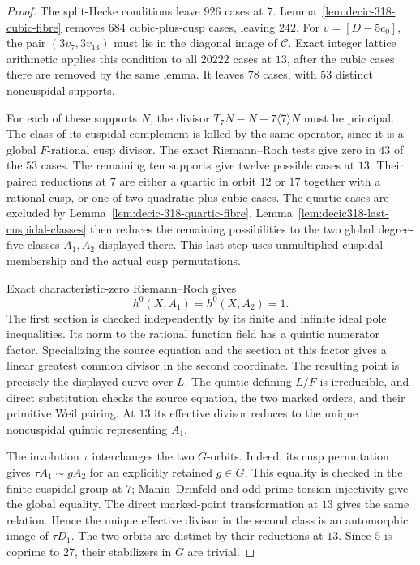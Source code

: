 \begin{proof}
The split-Hecke conditions leave $926$ cases at $7$.
Lemma~\ref{lem:decic-318-cubic-fibre} removes $684$ cubic-plus-cusp
cases, leaving $242$.
For $v=[D-5c_0]$, the pair
$(3\overline v_7,3\overline v_{13})$ must lie in the diagonal image
of $\mathcal C$. Exact integer lattice arithmetic applies this
condition to all $20222$ cases at $13$, after the cubic cases there
are removed by the same lemma. It leaves $78$ cases, with $53$
distinct noncuspidal supports.

For each of these supports $N$, the divisor
$T_7N-N-7\langle7\rangle N$ must be principal. The class of its cuspidal
complement is killed by the same operator, since it is a global
$F$-rational cusp divisor. The exact Riemann--Roch tests give
zero in $43$ of the $53$ cases.
The remaining ten supports give twelve possible cases at $13$.
Their paired reductions at $7$ are either a quartic in orbit
$12$ or $17$ together with a rational cusp, or one of two
quadratic-plus-cubic cases. The quartic cases are excluded by
Lemma~\ref{lem:decic-318-quartic-fibre}.
Lemma~\ref{lem:decic318-last-cuspidal-classes} then reduces the
remaining possibilities to the two global degree-five classes
$A_1,A_2$ displayed there. This last step uses unmultiplied
cuspidal membership and the actual cusp permutations.

Exact characteristic-zero Riemann--Roch gives
\[
                            h^0(X,A_1)=h^0(X,A_2)=1.
\]
The first section is checked independently by its finite and
infinite ideal pole inequalities. Its norm to the rational
function field has a quintic numerator factor. Specializing the
source equation and the section at this factor gives a linear
greatest common divisor in the second coordinate.
The resulting point is precisely the displayed curve over $L$.
The quintic defining $L/F$ is irreducible, and direct substitution
checks the source equation, the two marked orders, and their
primitive Weil pairing.
At $13$ its effective divisor reduces to the unique noncuspidal
quintic representing $A_1$.

The involution $\tau$ interchanges the two $G$-orbits.
Indeed, its cusp permutation gives
$\tau A_1\sim gA_2$ for an explicitly retained $g\in G$.
This equality is checked in the finite cuspidal group at $7$;
Manin--Drinfeld and odd-prime torsion injectivity give the global
equality. The direct marked-point transformation at $13$ gives
the same relation. Hence the unique effective divisor in the
second class is an automorphic image of $\tau D_1$.
The two orbits are distinct by their reductions at $13$.
Since $5$ is coprime to $27$, their stabilizers in $G$ are trivial.


\end{proof}
